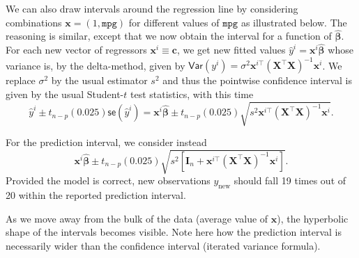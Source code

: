 \documentclass[]{book}
\newenvironment{Shaded}{\begin{snugshade}}{\end{snugshade}}
\newcommand{\CommentTok}[1]{\textcolor[rgb]{0.56,0.35,0.01}{\textit{#1}}}
\newcommand{\DataTypeTok}[1]{\textcolor[rgb]{0.13,0.29,0.53}{#1}}
\newcommand{\DecValTok}[1]{\textcolor[rgb]{0.00,0.00,0.81}{#1}}
\newcommand{\KeywordTok}[1]{\textcolor[rgb]{0.13,0.29,0.53}{\textbf{#1}}}
\newcommand{\NormalTok}[1]{#1}
\newcommand{\OperatorTok}[1]{\textcolor[rgb]{0.81,0.36,0.00}{\textbf{#1}}}
\newcommand{\OtherTok}[1]{\textcolor[rgb]{0.56,0.35,0.01}{#1}}
\newcommand{\StringTok}[1]{\textcolor[rgb]{0.31,0.60,0.02}{#1}}
\theoremstyle{definition}
\theoremstyle{definition}
\theoremstyle{definition}
\theoremstyle{remark}
\begin{document}
We can also draw intervals around the regression line by considering
combinations \(\mathbf{x} = (1, \texttt{mpg})\) for different values of
\(\texttt{mpg}\) as illustrated below. The reasoning is similar, except
that we now obtain the interval for a function of
\(\widehat{\boldsymbol{\beta}}\). For each new vector of regressors
\(\mathbf{x}^i \equiv \mathbf{c}\), we get new fitted values
\(\hat{y}^i= \mathbf{x}^i\widehat{\boldsymbol{\beta}}\) whose variance
is, by the delta-method, given by
\(\mathsf{Var}(y^i)={\sigma^2}\mathbf{x}^{i\top}(\mathbf{X}^\top\mathbf{X})^{-1}\mathbf{x}^i\).
We replace \(\sigma^2\) by the usual estimator \(s^2\) and thus the
pointwise confidence interval is given by the usual Student-\(t\) test
statistics, with this time
\[\hat{y}^i \pm t_{n-p}({0.025})\mathsf{se}(\hat{y}^i) =  \mathbf{x}^i\widehat{\boldsymbol{\beta}} \pm t_{n-p}({0.025})\sqrt{s^2\mathbf{x}^{i\top}(\mathbf{X}^\top\mathbf{X})^{-1}\mathbf{x}^i}.\]

For the prediction interval, we consider instead
\[ \mathbf{x}^i\widehat{\boldsymbol{\beta}} \pm t_{n-p}({0.025})\sqrt{s^2 \left[ \mathbf{I}_n + \mathbf{x}^{i\top}(\mathbf{X}^\top\mathbf{X})^{-1}\mathbf{x}^i\right]}.\]
Provided the model is correct, new observations \(y_{\mathrm{new}}\)
should fall 19 times out of 20 within the reported prediction interval.

As we move away from the bulk of the data (average value of
\(\mathbf{x}\)), the hyperbolic shape of the intervals becomes visible.
Note here how the prediction interval is necessarily wider than the
confidence interval (iterated variance formula).

\begin{Shaded}
\end{Shaded}
\end{document}
